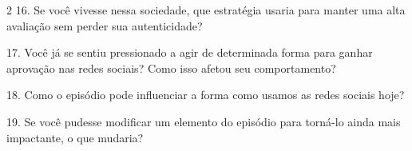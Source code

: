 \documentclass[11pt]{article}
\begin{document}
\begin{multicols}{2}
\hspace{0.6cm}16. Se você vivesse nessa sociedade, que estratégia usaria para manter uma alta avaliação sem perder sua autenticidade?  

17. Você já se sentiu pressionado a agir de determinada forma para ganhar aprovação nas redes sociais? Como isso afetou seu comportamento?  

18. Como o episódio pode influenciar a forma como usamos as redes sociais hoje?  

19. Se você pudesse modificar um elemento do episódio para torná-lo ainda mais impactante, o que mudaria?  

\end{multicols}
\end{document}
